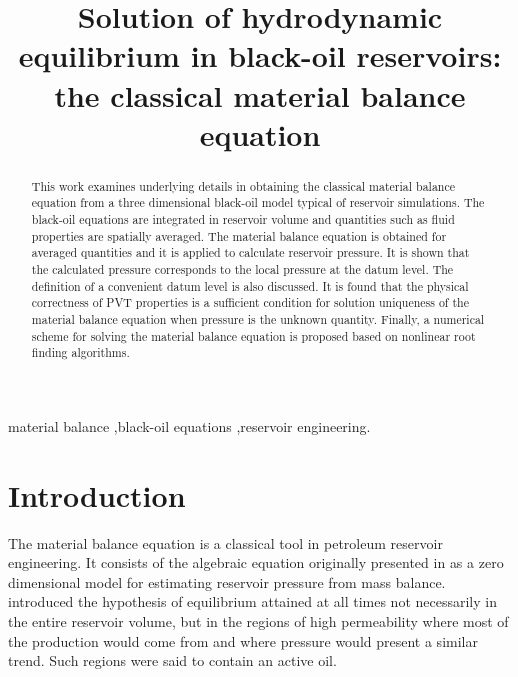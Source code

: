 \documentclass[authoryear,preprint,review,11pt]{elsarticle}
\begin{document}
\begin{frontmatter}
\title{Solution of hydrodynamic equilibrium in black-oil reservoirs: the classical material balance equation}

%



\begin{abstract}
This work examines underlying details in obtaining the classical material balance equation from a three dimensional black-oil model typical of reservoir simulations. The black-oil equations are integrated in reservoir volume and quantities such as fluid properties are spatially averaged. The material balance equation is obtained for averaged quantities and it is applied to calculate reservoir pressure. It is shown that the calculated pressure corresponds to the local pressure at the datum level. The definition of a convenient datum level is also discussed. It is found that the physical correctness of PVT properties
is a sufficient condition for solution uniqueness of the material balance equation when pressure is the unknown quantity.
Finally, a numerical scheme for solving the material balance equation is proposed based on nonlinear root finding algorithms.
\end{abstract}

\begin{keyword}
material balance \sep black-oil equations \sep reservoir engineering.
\end{keyword}
\end{frontmatter}

\section{Introduction}
The material balance equation is a classical tool in petroleum reservoir engineering. It consists of the algebraic equation originally presented in \cite{schilthuis1936active} as a zero dimensional model for estimating reservoir pressure from mass balance. \cite{schilthuis1936active} introduced the hypothesis of equilibrium attained at all times not necessarily in the entire reservoir volume, but in the regions of high permeability where most of the production would come from and where pressure would present a similar trend. Such regions were said to contain an active oil.
\end{document}
